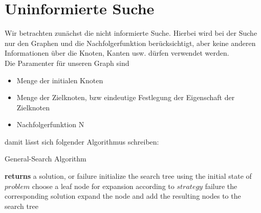 \bigskip
{}



\section{Uninformierte Suche}
Wir betrachten zunächst die nicht informierte Suche. Hierbei wird bei der Suche nur den Graphen und die Nachfolgerfunktion berücksichtigt, aber keine anderen Informationen über die Knoten, Kanten usw. dürfen verwendet werden.\\

Die Paramenter für unseren Graph sind

\begin{itemize}
  \item Menge der initialen Knoten
  \item Menge der Zielknoten, bzw eindeutige Festlegung der Eigenschaft der Zielknoten
  \item Nachfolgerfunktion N
\end{itemize}

damit lässt sich folgender Algorithmus schreiben:\\

\begin{algorithm}
\caption{General-Search Algorithm}
\begin{algorithmic}[1]
 \State \textbf{returns} a solution, or failure
\State initialize the search tree using the initial state of $problem$
\Loop \State choose a leaf node for expansion according to $strategy$
   failure \EndIf
   the corresponding solution
  \Else{} expand the node and add the resulting nodes to the search tree
  \EndIf
\EndLoop
\EndFunction
\end{algorithmic}
\end{algorithm}



